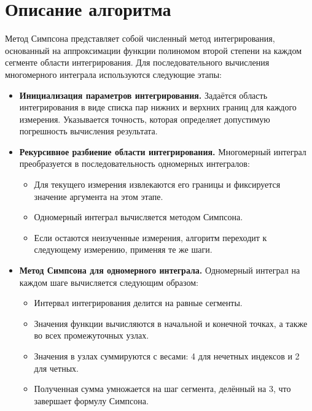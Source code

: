 \documentclass[12pt]{article}
\begin{document}
\section*{Описание алгоритма}
Метод Симпсона представляет собой численный метод интегрирования, основанный на аппроксимации функции полиномом второй степени на каждом сегменте области интегрирования. Для последовательного вычисления многомерного интеграла используются следующие этапы:

\begin{itemize}
    \item \textbf{Инициализация параметров интегрирования.}
          Задаётся область интегрирования в виде списка пар нижних и верхних границ для каждого измерения. Указывается точность, которая определяет допустимую погрешность вычисления результата.

    \item \textbf{Рекурсивное разбиение области интегрирования.}
          Многомерный интеграл преобразуется в последовательность одномерных интегралов:
          \begin{itemize}
              \item Для текущего измерения извлекаются его границы и фиксируется значение аргумента на этом этапе.
              \item Одномерный интеграл вычисляется методом Симпсона.
              \item Если остаются неизученные измерения, алгоритм переходит к следующему измерению, применяя те же шаги.
          \end{itemize}

    \item \textbf{Метод Симпсона для одномерного интеграла.}
          Одномерный интеграл на каждом шаге вычисляется следующим образом:
          \begin{itemize}
              \item Интервал интегрирования делится на равные сегменты.
              \item Значения функции вычисляются в начальной и конечной точках, а также во всех промежуточных узлах.
              \item Значения в узлах суммируются с весами: 4 для нечетных индексов и 2 для четных.
              \item Полученная сумма умножается на шаг сегмента, делённый на 3, что завершает формулу Симпсона.
          \end{itemize}


\end{itemize}
\end{document}
